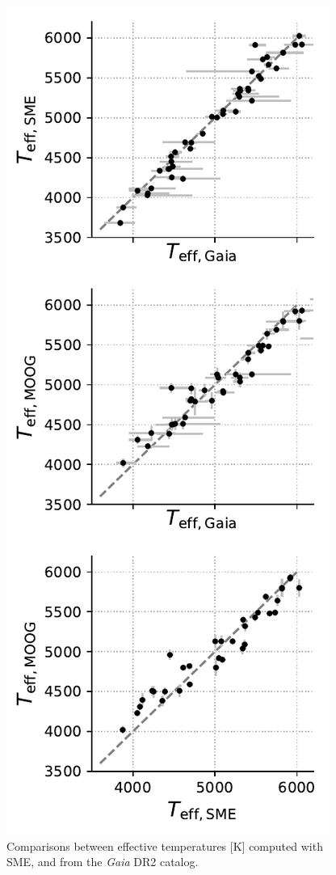 \begin{figure}
    \centering
    \includegraphics[scale=1]{freckles/temperature_comparison.pdf}
    \caption{Comparisons between effective temperatures [K] computed with SME, \moog and from the {\it Gaia} DR2 catalog.}
    \label{fig:temps}
\end{figure}

